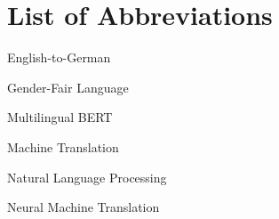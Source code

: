 \chapter*{List of Abbreviations}  
\begin{description}[align=left,labelwidth=3cm]
  \item[EN-DE] English-to-German
  \item[GFL] Gender-Fair Language
  \item[mBERT] Multilingual BERT
  \item[MT] Machine Translation
  \item[NLP] Natural Language Processing
  \item[NMT] Neural Machine Translation
\end{description}

